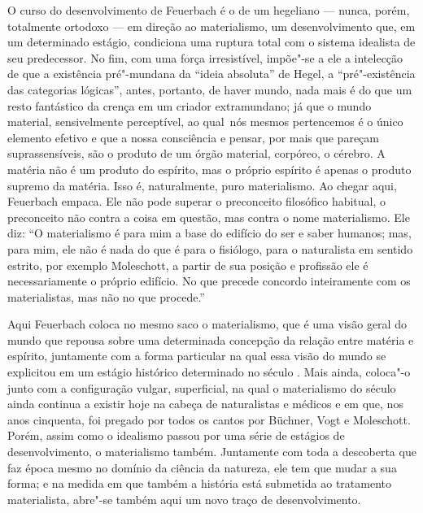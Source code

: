 O curso do desenvolvimento
de Feuerbach é
o de um hegeliano --- nunca, porém, totalmente ortodoxo --- em direção ao
materialismo, um desenvolvimento que, em um determinado estágio,
condiciona uma ruptura total com o sistema idealista de seu predecessor.
No fim, com uma força irresistível, impõe"-se a ele a intelecção de que a %
existência pré"-mundana da ``ideia absoluta''
de Hegel,
a ``pré"-existência das categorias lógicas'', antes, portanto, de haver
mundo, nada mais é do que um resto fantástico da crença em um criador
extramundano; já que o mundo material, sensivelmente perceptível, ao
qual\est\ nós mesmos pertencemos é o único elemento efetivo e que a nossa
consciência e pensar, por mais que pareçam suprassensíveis, são o %
produto de um órgão material, corpóreo, o cérebro. A matéria não é um
produto do espírito, mas o próprio espírito é apenas 
o produto supremo da matéria. Isso é, naturalmente, 
puro materialismo. Ao chegar aqui, Feuerbach empaca. Ele não pode
superar o preconceito filosófico habitual, o preconceito não contra a %
coisa em questão, mas contra o nome materialismo. Ele diz: ``O
materialismo é para mim a base do edifício do ser e saber humanos; mas,
para mim, ele não é nada do que é para o fisiólogo, para o naturalista em
sentido estrito, por exemplo Moleschott,
a partir de sua posição e profissão ele é necessariamente o próprio %
edifício. No que precede concordo inteiramente com os materialistas, mas
não no que procede.''

Aqui
Feuerbach coloca
no mesmo saco o materialismo, que é uma visão geral do mundo que repousa
sobre uma determinada concepção da relação entre matéria e espírito,
juntamente com a forma particular na qual essa visão do mundo se %
explicitou em um estágio histórico determinado \textbar{} no século  \textbar{}. %
Mais ainda, coloca"-o junto com a configuração vulgar, superficial, na qual
o materialismo do século  ainda continua a existir hoje na cabeça %
de naturalistas e médicos e em que, nos anos cinquenta, foi pregado por %
todos os cantos
por Büchner, Vogt e Moleschott. Porém,
assim como o idealismo passou por uma série de estágios de
desenvolvimento, o materialismo também. Juntamente com toda a descoberta %
que faz época mesmo no domínio da ciência da natureza, ele tem que mudar
a sua forma; e na medida em que também a história está submetida ao
tratamento materialista, abre"-se também aqui um novo traço de %
desenvolvimento.

